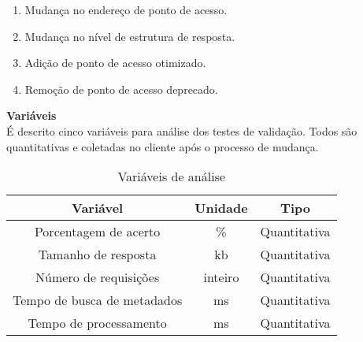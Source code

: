 \begin{enumerate}
\item Mudança no endereço de ponto de acesso.
\item Mudança no nível de estrutura de resposta.
\item Adição de ponto de acesso otimizado.
\item Remoção de ponto de acesso deprecado.
\end{enumerate}

\textbf{Variáveis} \\

É descrito cinco variáveis para análise dos testes de validação. Todos são quantitativas e coletadas no cliente após o processo de mudança.

\begin{table}[H]
  \centering
  \begin{tabular}{|c|c|c|}
    \hline
    Variável & Unidade & Tipo \\
    \hline
    Porcentagem de acerto & \% & Quantitativa \\
    \hline
    Tamanho de resposta & kb & Quantitativa \\
    \hline
    Número de requisições & inteiro & Quantitativa \\
    \hline
    Tempo de busca de metadados & ms & Quantitativa \\
    \hline
    Tempo de processamento & ms & Quantitativa \\
    \hline
  \end{tabular}
  \caption{Variáveis de análise}
\end{table}

 
 
 
 
 
 

 
